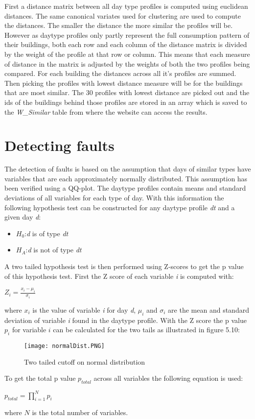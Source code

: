 First a distance matrix between all day type profiles is computed using euclidean distances. The same canonical variates used for clustering are used to compute the distances. The smaller the distance the more similar the profiles will be. However as daytype profiles only partly represent the full consumption pattern of their buildings, both each row and each column of the distance matrix is divided by the weight of the profile at that row or column. This means that each measure of distance in the matrix is adjusted by the weights of both the two profiles being compared. For each building the distances across all it's profiles are summed. Then picking the profiles with lowest distance measure will be for the buildings that are most similar. The 30 profiles with lowest distance are picked out and the ids of the buildings behind those profiles are stored in an array which is saved to the \emph{W\_Similar} table from where the website can access the results.
\section{Detecting faults}
The detection of faults is based on the assumption that days of similar types have variables that are each approximately normally distributed. This assumption has been verified using a QQ-plot. The daytype profiles contain means and standard deviations of all variables for each type of day. With this information the following hypothesis test can be constructed for any daytype profile \emph{dt} and a given day \emph{d}:
\begin{itemize}
\item $H_0$:\emph{d} is of type \emph{dt}
\item $H_A$:\emph{d} is not of type \emph{dt}
\end{itemize}
A two tailed hypothesis test is then performed using Z-scores to get the p value of this hypothesis test. First the Z score of each variable \emph{i} is computed with:
\begin{center}
$Z_i=\frac{x_i-\mu_i}{\sigma_i}$
\end{center}
where $x_i$ is the value of variable \emph{i} for day \emph{d}, $\mu_i$ and $\sigma_i$ are the mean and standard deviation of variable \emph{i} found in the daytype profile. With the Z score the p value $p_i$ for variable $i$ can be calculated for the two tails as illustrated in figure 5.10:
\begin{figure}
\begin{center}
\texttt{[image: normalDist.PNG]}
\end{center}
\caption{Two tailed cutoff on normal distribution}
\end{figure}
To get the total p value $p_{total}$ across all variables the following equation is used:
\begin{center}
$p_{total}=\displaystyle\prod_{i=1}^N p_i$
\end{center}
where $N$ is the total number of variables.

